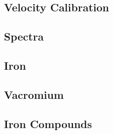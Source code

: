 \subsection{Velocity Calibration}

\subsection{Spectra}

\subsection{Iron}

\subsection{Vacromium}

\subsection{Iron Compounds}
